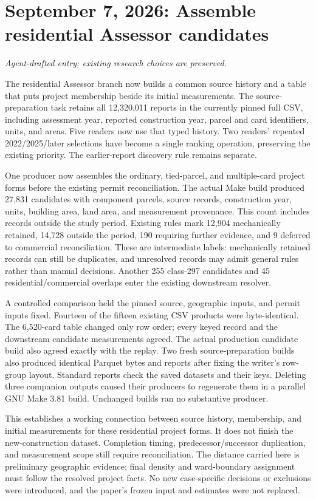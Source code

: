 \section*{September 7, 2026: Assemble residential Assessor candidates}
\textit{Agent-drafted entry; existing research choices are preserved.}

The residential Assessor branch now builds a common source history and a table
that puts project membership beside its initial measurements. The source-preparation
task retains all 12,320,011 reports in the currently pinned full CSV, including
assessment year, reported construction year, parcel and card identifiers, units,
and areas. Five readers now use that typed history. Two readers' repeated
2022/2025/later selections have become a single ranking operation, preserving the
existing priority. The earlier-report discovery rule remains separate.

One producer now assembles the ordinary, tied-parcel, and multiple-card project
forms before the existing permit reconciliation. The actual Make build produced
27,831 candidates with component parcels, source records, construction year, units,
building area, land area, and measurement provenance. This count includes records
outside the study period. Existing rules mark 12,904 mechanically retained, 14,728
outside the period, 190 requiring further evidence, and 9 deferred to commercial
reconciliation. These are intermediate labels: mechanically retained records can
still be duplicates, and unresolved records may admit general rules rather than
manual decisions. Another 255 class-297 candidates and 45 residential/commercial
overlaps enter the existing downstream resolver.

A controlled comparison held the pinned source, geographic inputs, and permit
inputs fixed. Fourteen of the fifteen existing CSV products were byte-identical.
The 6,520-card table changed only row order; every keyed record and the downstream
candidate measurements agreed. The actual production candidate build also agreed
exactly with the replay. Two fresh source-preparation builds also produced identical Parquet bytes and
reports after fixing the writer's row-group layout. Standard reports check the
saved datasets and their keys.
Deleting three companion outputs caused their producers to regenerate them in a
parallel GNU Make 3.81 build. Unchanged builds ran no substantive producer.

This establishes a working connection between source history, membership, and
initial measurements for these residential project forms. It does not finish the
new-construction dataset. Completion timing, predecessor/successor duplication,
and measurement scope still require reconciliation. The distance carried here is
preliminary geographic evidence; final density and ward-boundary assignment must
follow the resolved project facts. No new case-specific decisions or exclusions
were introduced, and the paper's frozen input and estimates were not replaced.

